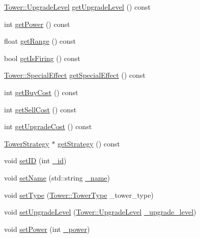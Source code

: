 \begin{DoxyCompactItemize}
\item 
\hyperlink{class_tower_a23889cd9ee2fbae0420c97105fd6ebc8}{Tower\+::\+Upgrade\+Level} \hyperlink{class_tower_ae8236cf1fac3f2fd791312e3dc59d904}{get\+Upgrade\+Level} () const 
\item 
int \hyperlink{class_tower_a198af6f04dad766d019b72fc667b90a7}{get\+Power} () const 
\item 
float \hyperlink{class_tower_ac11ad49620dd4af1a72459508ca0856a}{get\+Range} () const 
\item 
bool \hyperlink{class_tower_a488db197289e0850f573310a13cfecef}{get\+Is\+Firing} () const 
\item 
\hyperlink{class_tower_a355ab1cbcfd8c4d037ccf8937f784445}{Tower\+::\+Special\+Effect} \hyperlink{class_tower_a9ef4f0f087f1bc09fe0e4e30e44ca6a5}{get\+Special\+Effect} () const 
\item 
int \hyperlink{class_tower_af2bb341e8011c2526ad5c58e11d79b28}{get\+Buy\+Cost} () const 
\item 
int \hyperlink{class_tower_adae75d4203ca7c3a92da1fe367d64bac}{get\+Sell\+Cost} () const 
\item 
int \hyperlink{class_tower_a6211c9d5d2718c1d65efb0b636e74d77}{get\+Upgrade\+Cost} () const 
\item 
\hyperlink{class_tower_strategy}{Tower\+Strategy} $\ast$ \hyperlink{class_tower_a5a75e27e64a3df45d6c88b141ccf202d}{get\+Strategy} () const 
\item 
void \hyperlink{class_tower_a2ad5e52d8c8e3c5783b1c3499f19ceca}{set\+I\+D} (int \hyperlink{class_tower_a02ec2f8d1c4dea2f7fc002d8626c8b28}{\+\_\+id})
\item 
void \hyperlink{class_tower_afa5c0c8cb518b93184be21d86d1bfc56}{set\+Name} (std\+::string \hyperlink{class_tower_ac29247d1ed8c97c105f5f1e05fb1f92c}{\+\_\+name})
\item 
void \hyperlink{class_tower_a47ee9428118e95e689950ad605f90cb3}{set\+Type} (\hyperlink{class_tower_a110a21c18d4ec095c6234bd17f004b3e}{Tower\+::\+Tower\+Type} \+\_\+tower\+\_\+type)
\item 
void \hyperlink{class_tower_ac31643b1a10e1821d90583dc9ff03943}{set\+Upgrade\+Level} (\hyperlink{class_tower_a23889cd9ee2fbae0420c97105fd6ebc8}{Tower\+::\+Upgrade\+Level} \hyperlink{class_tower_a0172731487da6a0480901e031e2aecbe}{\+\_\+upgrade\+\_\+level})
\item 
void \hyperlink{class_tower_a89f3c815849be59057c2bcdeb1bb097f}{set\+Power} (int \hyperlink{class_tower_af9e223c165f5632944868df3dfc70bee}{\+\_\+power})
\item 

\end{DoxyCompactItemize}
